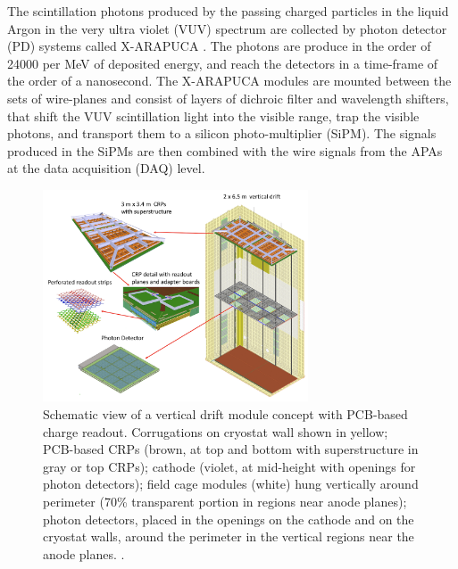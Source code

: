 The scintillation photons produced by the passing charged particles in the liquid Argon in the very ultra violet (VUV) spectrum are collected by photon detector (PD) systems called X-ARAPUCA \cite{Segreto:2018jdx}. The photons are produce in the order of 24000 per MeV of deposited energy, and reach the detectors in a time-frame of the order of a nanosecond. The X-ARAPUCA modules are mounted between the sets of wire-planes and consist of layers of dichroic filter and wavelength shifters, that shift the VUV scintillation light into the visible range, trap the visible photons, and transport them to a silicon photo-multiplier (SiPM). The signals produced in the SiPMs are then combined with the wire signals from the APAs at the data acquisition (DAQ) level.

\begin{figure}[!t]
     \centering
     \includegraphics[width=0.7\textwidth]{figures/ch3-DUNE/setup_new_updated.png}
     \caption[Schematic view of a vertical drift module concept with PCB-based charge readout.]{Schematic view of a vertical drift module concept with PCB-based charge readout. Corrugations on cryostat wall shown in yellow; PCB-based CRPs (brown, at top and bottom with superstructure in gray or top CRPs); cathode (violet, at mid-height with openings for photon detectors); field cage modules (white) hung vertically around perimeter (70\% transparent portion in regions near anode planes); photon detectors, placed in the openings on the cathode and on the cryostat walls, around the perimeter in the vertical regions near the anode planes. \cite{DUNE:2023TDRVD}.}
        \label{fig:FDLArTPCModule}
\end{figure}


